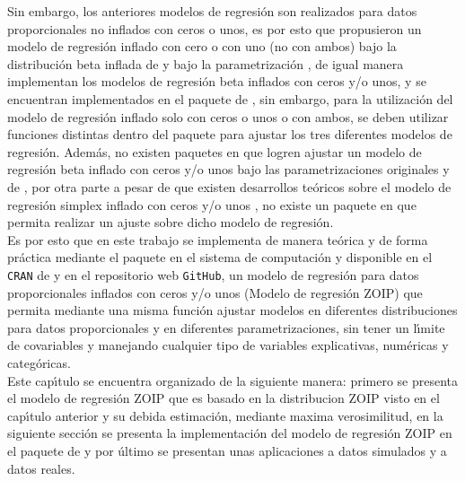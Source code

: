 Sin embargo, los anteriores modelos de regresi\'{o}n son realizados para datos proporcionales no inflados con ceros o unos, es por esto que \cite{Ospina1} propusieron un modelo de regresi\'{o}n inflado con cero o con uno (no con ambos) bajo la distribuci\'{o}n beta inflada de \cite{Ospina2} y bajo la parametrizaci\'{o}n \cite{Ferrari2}, de igual manera \cite{Stasinopoulos2} implementan los modelos de regresi\'{o}n beta inflados con ceros y/o unos, y se encuentran implementados en el paquete  de  \citep{Stasinopoulos1}, sin embargo, para la utilizaci\'{o}n del modelo de regresi\'{o}n inflado solo con ceros o unos o con ambos, se deben utilizar funciones distintas dentro del paquete para ajustar los tres diferentes modelos de regresi\'{o}n. Adem\'{a}s, no existen paquetes en  que logren ajustar un modelo de regresi\'{o}n beta inflado con ceros y/o unos bajo las parametrizaciones originales y de \cite{Ferrari2}, por otra parte a pesar de que existen desarrollos te\'{o}ricos sobre el modelo de regresi\'{o}n simplex inflado con ceros y/o unos \citep{Galvis1}, no existe un paquete en  que permita realizar un ajuste sobre dicho modelo de regresi\'{o}n.\\

Es por esto que en este trabajo se implementa de manera te\'{o}rica y de forma pr\'{a}ctica mediante el paquete  en el sistema de computaci\'{o}n  \citep{R} y disponible en el \verb|CRAN| de  y en el repositorio web \verb|GitHub|, un modelo de regresi\'{o}n para datos proporcionales inflados con ceros y/o unos (Modelo de regresi\'{o}n ZOIP) que permita mediante una misma funci\'{o}n ajustar mo\-de\-los en diferentes distribuciones para datos proporcionales y en diferentes parametrizaciones, sin tener un l\'{\i}mite de covariables y manejando cualquier tipo de variables explicativas, num\'{e}ricas y categ\'{o}ricas.\\

Este cap\'{\i}tulo se encuentra organizado de la siguiente manera: primero se presenta el modelo de regresi\'{o}n ZOIP que es basado en la distribucion ZOIP visto en el cap\'{\i}tulo anterior y su debida estimaci\'{o}n, mediante maxima verosimilitud, en la siguiente secci\'{o}n se presenta la implementaci\'{o}n del modelo de regresi\'{o}n ZOIP en el paquete  de  y por \'{u}ltimo se presentan unas aplicaciones a datos simulados y a datos reales.



